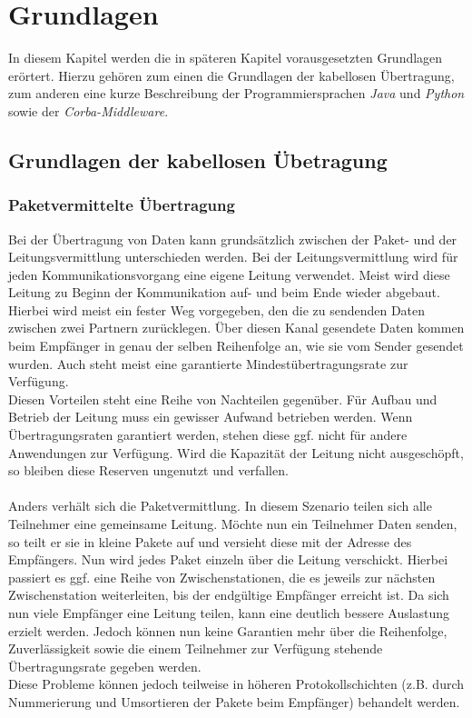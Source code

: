
\chapter{Grundlagen}\label{Grundlagen}

In diesem Kapitel werden die in späteren Kapitel vorausgesetzten Grundlagen
erörtert. Hierzu gehören zum einen die Grundlagen der kabellosen Übertragung, zum anderen eine kurze Beschreibung der
Programmiersprachen \emph{Java} und \emph{Python} sowie der \emph{Corba-Middleware}. 

\section{Grundlagen der kabellosen Übetragung}
    \subsection{Paketvermittelte Übertragung}
        Bei der Übertragung von Daten kann grundsätzlich zwischen der Paket- und der Leitungsvermittlung unterschieden 
        werden. Bei der Leitungsvermittlung wird für jeden Kommunikationsvorgang eine eigene Leitung verwendet. 
        Meist wird diese Leitung zu Beginn der Kommunikation auf- und beim Ende wieder abgebaut. Hierbei wird
        meist ein fester Weg vorgegeben, den die zu sendenden Daten zwischen zwei Partnern zurücklegen. Über diesen Kanal
        gesendete Daten kommen beim Empfänger in genau der selben Reihenfolge an, wie sie vom Sender gesendet wurden.
        Auch steht meist eine garantierte Mindestübertragungsrate zur Verfügung. \\
        Diesen Vorteilen steht eine Reihe von Nachteilen gegenüber. Für Aufbau und Betrieb der Leitung muss ein gewisser
        Aufwand betrieben werden. Wenn Übertragungsraten garantiert werden, stehen diese ggf. nicht für andere 
        Anwendungen zur Verfügung. Wird die Kapazität der Leitung nicht ausgeschöpft, so bleiben diese Reserven 
        ungenutzt und verfallen.\\
        \\
        Anders verhält sich die Paketvermittlung. In diesem Szenario teilen sich alle Teilnehmer eine gemeinsame
        Leitung. Möchte nun ein Teilnehmer Daten senden, so teilt er sie in kleine Pakete auf und versieht diese
        mit der Adresse des Empfängers. Nun wird jedes Paket einzeln über die Leitung verschickt. Hierbei passiert 
        es ggf. eine Reihe von Zwischenstationen, die es jeweils zur nächsten Zwischenstation weiterleiten, bis der
        endgültige Empfänger erreicht ist. Da sich nun viele Empfänger eine Leitung teilen, kann eine deutlich bessere
        Auslastung erzielt werden. Jedoch können nun keine Garantien mehr über die Reihenfolge, Zuverlässigkeit
        sowie die einem Teilnehmer zur Verfügung stehende Übertragungsrate gegeben werden.\\
        Diese Probleme können jedoch teilweise in höheren Protokollschichten (z.B. durch Nummerierung und Umsortieren 
        der Pakete beim Empfänger) behandelt werden.

